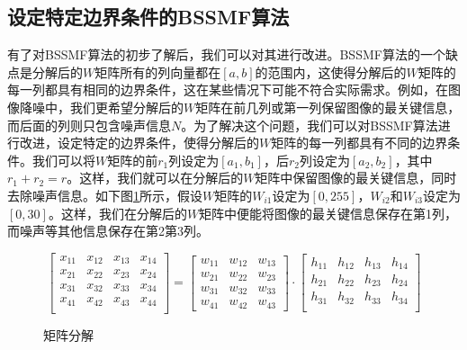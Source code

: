 \documentclass[12pt]{article}
\begin{document}
\subsection{设定特定边界条件的BSSMF算法}

有了对BSSMF算法的初步了解后，我们可以对其进行改进。BSSMF算法的一个缺点是分解后的$W$矩阵所有的列向量都在$[a,b]$的范围内，这使得分解后的$W$矩阵的每一列都具有相同的边界条件，这在某些情况下可能不符合实际需求。例如，在图像降噪中，我们更希望分解后的$W$矩阵在前几列或第一列保留图像的最关键信息，而后面的列则只包含噪声信息$N$。为了解决这个问题，我们可以对BSSMF算法进行改进，设定特定的边界条件，使得分解后的$W$矩阵的每一列都具有不同的边界条件。我们可以将$W$矩阵的前$r_1$列设定为$[a_1,b_1]$，后$r_2$列设定为$[a_2,b_2]$，其中$r_1+r_2=r$。这样，我们就可以在分解后的$W$矩阵中保留图像的最关键信息，同时去除噪声信息。如下图\ref{fig:matrix_decomposition}所示，假设$W$矩阵的$W_{i1}$设定为$[0,255]$，$W_{i2}$和$W_{i3}$设定为$[0,30]$。这样，我们在分解后的$W$矩阵中便能将图像的最关键信息保存在第1列，而噪声等其他信息保存在第2第3列。
\begin{figure}
    \centering
    \begin{equation*}
        \begin{bmatrix}
            x_{11} & x_{12} & x_{13} & x_{14} \\
            x_{21} & x_{22} & x_{23} & x_{24} \\
            x_{31} & x_{32} & x_{33} & x_{34} \\
            x_{41} & x_{42} & x_{43} & x_{44} \\
        \end{bmatrix}
        =
        \begin{bmatrix}
            w_{11} & w_{12} & w_{13}\\
            w_{21} & w_{22} & w_{23} \\
            w_{31} & w_{32} & w_{33} \\
            w_{41} & w_{42} & w_{43}

        \end{bmatrix}
        \cdot
        \begin{bmatrix}
            h_{11} & h_{12} & h_{13} & h_{14} \\
            h_{21} & h_{22} & h_{23} & h_{24} \\
            h_{31} & h_{32} & h_{33} & h_{34} \\
        \end{bmatrix}
    \end{equation*}
    \caption{矩阵分解}
    \label{fig:matrix_decomposition}
\end{figure}
\end{document}

